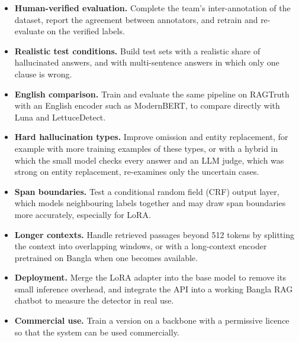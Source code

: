 \begin{itemize}
  \item \textbf{Human-verified evaluation.} Complete the team's inter-annotation
  of the dataset, report the agreement between annotators, and retrain and
  re-evaluate on the verified labels.
  \item \textbf{Realistic test conditions.} Build test sets with a realistic
  share of hallucinated answers, and with multi-sentence answers in which only
  one clause is wrong.
  \item \textbf{English comparison.} Train and evaluate the same pipeline on
  RAGTruth~\cite{ragtruth} with an English encoder such as ModernBERT, to
  compare directly with Luna and LettuceDetect.
  \item \textbf{Hard hallucination types.} Improve omission and entity
  replacement, for example with more training examples of these types, or with
  a hybrid in which the small model checks every answer and an LLM judge, which
  was strong on entity replacement, re-examines only the uncertain cases.
  \item \textbf{Span boundaries.} Test a conditional random field (CRF) output
  layer, which models neighbouring labels together and may draw span
  boundaries more accurately, especially for LoRA.
  \item \textbf{Longer contexts.} Handle retrieved passages beyond 512 tokens by
  splitting the context into overlapping windows, or with a long-context
  encoder pretrained on Bangla when one becomes available.
  \item \textbf{Deployment.} Merge the LoRA adapter into the base model to
  remove its small inference overhead, and integrate the API into a working
  Bangla RAG chatbot to measure the detector in real use.
  \item \textbf{Commercial use.} Train a version on a backbone with a
  permissive licence so that the system can be used commercially.
\end{itemize}
